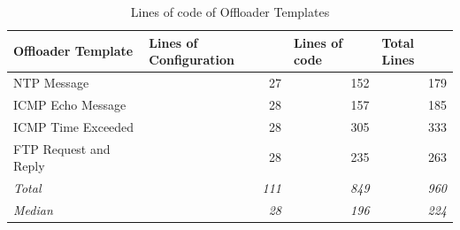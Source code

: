 \begin{table}[htb]
    \caption{Lines of code of Offloader Templates}
    \begin{center}
        \begin{tabular}{|l|r|r|r|}
            \hline
            \textbf{Offloader Template}        & \multicolumn{1}{l|}{\textbf{Lines of Configuration}} & \multicolumn{1}{l|}{\textbf{Lines of code}} & \multicolumn{1}{l|}{\textbf{Total Lines}} \\ \hline
            NTP Message                        & 27                                                   & 152                                         & 179                                       \\ \hline
            ICMP Echo Message                  & 28                                                   & 157                                         & 185                                       \\ \hline
            ICMP Time Exceeded & 28                                                   & 305                                         & 333                                       \\ \hline
            FTP Request and Reply              & 28                                                   & 235                                         & 263                                       \\ \hline
            \textit{Total}                     & \textit{111}                                         & \textit{849}                                & \textit{960}                              \\ \hline
            \textit{Median}                    & \textit{28}                                          & \textit{196}                                & \textit{224}                              \\ \hline
        \end{tabular}%
    \end{center}
    \label{tab:lines_by_offloader_template}
\end{table}




